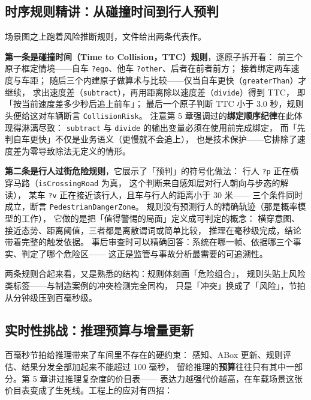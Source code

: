 \subsection{时序规则精讲：从碰撞时间到行人预判}

场景图之上跑着风险推断规则，文件给出两条代表作。



\textbf{第一条是碰撞时间（Time to Collision，TTC）规则}，逐原子拆开看：
前三个原子框定情境——自车 \texttt{?ego}、他车 \texttt{?other}、后者在前者前方；
接着绑定两车速度与车距；
随后三个内建原子做算术与比较——仅当自车更快（\texttt{greaterThan}）才继续，
求出速度差（\texttt{subtract}），再用距离除以速度差（\texttt{divide}）得到 TTC，
即「按当前速度差多少秒后追上前车」；
最后一个原子判断 TTC 小于 3.0 秒，规则头便给这对车辆断言 \texttt{CollisionRisk}。
注意第 5 章强调过的\textbf{绑定顺序纪律}在此体现得淋漓尽致：
\texttt{subtract} 与 \texttt{divide} 的输出变量必须在使用前完成绑定，
而「先判自车更快」不仅是业务语义（更慢就不会追上），
也是技术保护——它排除了速度差为零导致除法无定义的情形。

\textbf{第二条是行人过街危险规则}，它展示了「预判」的符号化做法：
行人 \texttt{?p} 正在横穿马路（\texttt{isCrossingRoad} 为真，
这个判断来自感知层对行人朝向与步态的解读），
某车 \texttt{?v} 正在接近该行人，且车与行人的距离小于 30 米——
三个条件同时成立，断言 \texttt{PedestrianDangerZone}。
规则没有预测行人的精确轨迹（那是概率模型的工作），
它做的是把「值得警惕的局面」定义成可判定的概念：
横穿意图、接近态势、距离阈值，三者都是离散谓词或简单比较，
推理在毫秒级完成，结论带着完整的触发依据。
事后审查时可以精确回答：系统在哪一帧、依据哪三个事实、判定了哪个危险区——
这正是监管与事故分析最需要的可追溯性。

两条规则合起来看，又是熟悉的结构：规则体刻画「危险组合」，
规则头贴上风险类标签——与制造案例的冲突检测完全同构，
只是「冲突」换成了「风险」，节拍从分钟级压到百毫秒级。

\subsection{实时性挑战：推理预算与增量更新}

百毫秒节拍给推理带来了车间里不存在的硬约束：
感知、ABox 更新、规则评估、结果分发全部加起来不能超过 100 毫秒，
留给推理的\textbf{预算}往往只有其中一部分。第 5 章讲过推理复杂度的价目表——
表达力越强代价越高，在车载场景这张价目表变成了生死线。工程上的应对有四招：

